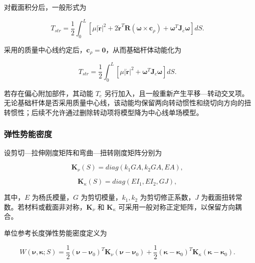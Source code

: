对截面积分后，一般形式为

\begin{equation}
\label{eq:rod-1-29}
T_{str} = \frac{1}{2}\int_{0}^{L}\left\lbrack \mu\left| \dot{\mathbf{r}} \right|^{2} + 2{\dot{\mathbf{r}}}^{T}\mathbf{R}\left( \bm{\omega} \times \mathbf{c}_{\rho} \right) + \bm{\omega}^{T}\mathbf{J}_{c}\bm{\omega} \right\rbrack dS.
\end{equation}

采用的质量中心线约定后，\(\mathbf{c}_{\rho} = \mathbf{0}\)，从而基础杆体动能化为

\begin{equation}
\label{eq:rod-1-30}
\boxed{T_{str} = \frac{1}{2}\int_{0}^{L}\left\lbrack \mu\left| \dot{\mathbf{r}} \right|^{2} + \bm{\omega}^{T}\mathbf{J}_{c}\bm{\omega} \right\rbrack dS.}
\end{equation}

若存在偏心附加部件，其动能 \(T_{e}\) 另行加入，且一般重新产生平移---转动交叉项。无论基础杆体是否采用质量中心线，该动能均保留两向转动惯性和绕切向方向的扭转惯性；后续不允许通过删除转动项将模型降为中心线单场模型。

\subsubsection{弹性势能密度}\label{sec:rod-1-3-3}

设剪切---拉伸刚度矩阵和弯曲---扭转刚度矩阵分别为

\begin{equation}
\label{eq:rod-1-31}
\mathbf{K}_{\nu}(S) = diag\left( k_{1}GA,k_{2}GA,EA \right),
\end{equation}

\begin{equation}
\label{eq:rod-1-32}
\mathbf{K}_{\kappa}(S) = diag\left( EI_{1},EI_{2},GJ \right),
\end{equation}

其中，\(E\) 为杨氏模量，\(G\) 为剪切模量，\(k_{1},k_{2}\) 为剪切修正系数，\(J\) 为截面扭转常数。若材料或截面非对称，\(\mathbf{K}_{\nu}\) 和 \(\mathbf{K}_{\kappa}\) 可采用一般对称正定矩阵，以保留方向耦合。

单位参考长度弹性势能密度定义为

\begin{equation}
\label{eq:rod-1-33}
W\left( \bm{\nu},\bm{\kappa};S \right) = \frac{1}{2}\left( \bm{\nu} - \bm{\nu}_{0} \right)^{T}\mathbf{K}_{\nu}\left( \bm{\nu} - \bm{\nu}_{0} \right) + \frac{1}{2}\left( \bm{\kappa} - \bm{\kappa}_{0} \right)^{T}\mathbf{K}_{\kappa}\left( \bm{\kappa} - \bm{\kappa}_{0} \right).
\end{equation}

